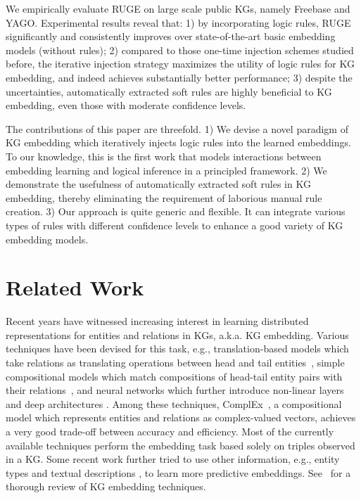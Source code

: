 \documentclass[letterpaper]{article} \usepackage{aaai18}  \usepackage{times}  \usepackage{helvet}  \usepackage{courier}  \usepackage{url}  \usepackage{graphicx}  \usepackage{amsmath}
\begin{document}
We empirically evaluate RUGE on large scale public KGs, namely Freebase and YAGO. Experimental results reveal that: 1) by incorporating logic rules, RUGE significantly and consistently improves over state-of-the-art basic embedding models (without rules); 2) compared to those one-time injection schemes studied before, the iterative injection strategy maximizes the utility of logic rules for KG embedding, and indeed achieves substantially better performance; 3) despite the uncertainties, automatically extracted soft rules are highly beneficial to KG embedding, even those with moderate confidence levels.

The contributions of this paper are threefold. 1) We devise a novel paradigm of KG embedding which iteratively injects logic rules into the learned embeddings. To our knowledge, this is the first work that models interactions between embedding learning and logical inference in a principled framework. 2) We demonstrate the usefulness of automatically extracted soft rules in KG embedding, thereby eliminating the requirement of laborious manual rule creation. 3) Our approach is quite generic and flexible. It can integrate various types of rules with different confidence levels to enhance a good variety of KG embedding models.

\section{Related Work}
Recent years have witnessed increasing interest in learning distributed representations for entities and relations in KGs, a.k.a. KG embedding. Various techniques have been devised for this task, e.g., translation-based models which take relations as translating operations between head and tail entities~\cite{bordes2013:TransE,wang2014:TransH,lin2015:TransR}, simple compositional models which match compositions of head-tail entity pairs with their relations~\cite{nickel2011:RESCAL,yang2015:DistMult,nickel2016:HolE,trouillon2016:ComplEx}, and neural networks which further introduce non-linear layers and deep architectures \cite{socher2013:NTN,bordes2014:SME,dong2014:KnowledgeVault,liu2016:NAM}. Among these techniques, ComplEx~\cite{trouillon2016:ComplEx}, a compositional model which represents entities and relations as complex-valued vectors, achieves a very good trade-off between accuracy and efficiency. Most of the currently available techniques perform the embedding task based solely on triples observed in a KG. Some recent work further tried to use other information, e.g., entity types \cite{guo2015:SSE,xie2016:TKRL} and textual descriptions \mbox{\cite{xie2016:DKRL,xiao2017:SSP}}, to learn more predictive embeddings. See~\cite{wang2017:KGEmbedding} for a thorough review of KG embedding techniques.
\end{document}
